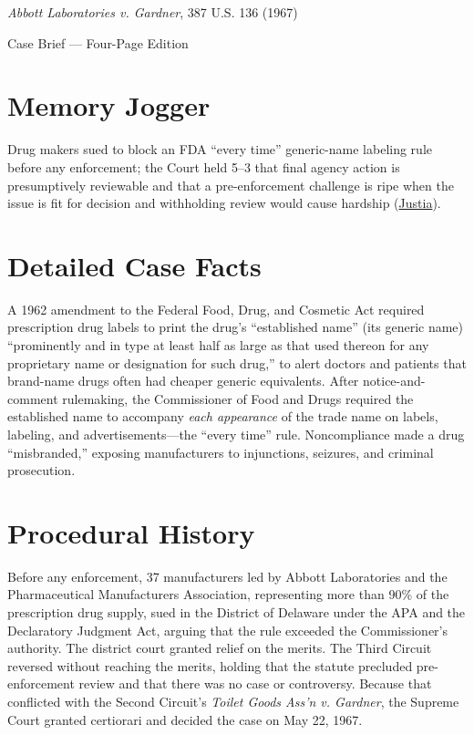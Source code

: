 \documentclass[12pt]{article}
\begin{document}
\begin{center}
{\LARGE \textit{Abbott Laboratories v. Gardner}, 387 U.S. 136 (1967)\par}
\vspace{0.8em}
{\large Case Brief --- Four-Page Edition\par}
\end{center}
\vspace{1em}

\section{Memory Jogger}

Drug makers sued to block an FDA ``every time'' generic-name labeling rule before any enforcement; the Court held 5--3 that final agency action is presumptively reviewable and that a pre-enforcement challenge is ripe when the issue is fit for decision and withholding review would cause hardship (\href{https://supreme.justia.com/cases/federal/us/387/136/}{Justia}).

\section{Detailed Case Facts}

A 1962 amendment to the Federal Food, Drug, and Cosmetic Act required prescription drug labels to print the drug's ``established name'' (its generic name) ``prominently and in type at least half as large as that used thereon for any proprietary name or designation for such drug,'' to alert doctors and patients that brand-name drugs often had cheaper generic equivalents. After notice-and-comment rulemaking, the Commissioner of Food and Drugs required the established name to accompany \emph{each appearance} of the trade name on labels, labeling, and advertisements---the ``every time'' rule. Noncompliance made a drug ``misbranded,'' exposing manufacturers to injunctions, seizures, and criminal prosecution.

\section{Procedural History}

Before any enforcement, 37 manufacturers led by Abbott Laboratories and the Pharmaceutical Manufacturers Association, representing more than 90\% of the prescription drug supply, sued in the District of Delaware under the APA and the Declaratory Judgment Act, arguing that the rule exceeded the Commissioner's authority. The district court granted relief on the merits. The Third Circuit reversed without reaching the merits, holding that the statute precluded pre-enforcement review and that there was no case or controversy. Because that conflicted with the Second Circuit's \textit{Toilet Goods Ass'n v. Gardner}, the Supreme Court granted certiorari and decided the case on May 22, 1967.
\end{document}
